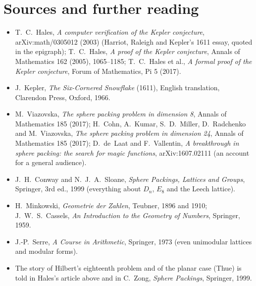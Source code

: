 \section*{Sources and further reading}

\begin{itemize}
\item T.~C.~Hales, \emph{A computer verification of the Kepler conjecture}, arXiv:math/0305012 (2003) (Harriot, Raleigh and Kepler's 1611 essay, quoted in the
epigraph); T.~C.~Hales, \emph{A proof of the Kepler conjecture}, Annals of Mathematics 162 (2005), 1065--1185; T.~C.~Hales et al., \emph{A formal proof of the
Kepler conjecture}, Forum of Mathematics, Pi 5 (2017).
\item J.~Kepler, \emph{The Six-Cornered Snowflake} (1611), English translation, Clarendon Press, Oxford, 1966.
\item M.~Viazovska, \emph{The sphere packing problem in dimension 8}, Annals of Mathematics 185 (2017); H.~Cohn, A.~Kumar, S.~D.~Miller, D.~Radchenko and
M.~Viazovska, \emph{The sphere packing problem in dimension 24}, Annals of Mathematics 185 (2017); D.~de~Laat and F.~Vallentin, \emph{A breakthrough in sphere
packing: the search for magic functions}, arXiv:1607.02111 (an account for a general audience).
\item J.~H.~Conway and N.~J.~A.~Sloane, \emph{Sphere Packings, Lattices and Groups}, Springer, 3rd ed., 1999 (everything about $D_n$, $E_8$ and the Leech lattice).
\item H.~Minkowski, \emph{Geometrie der Zahlen}, Teubner, 1896 and 1910; J.~W.~S.~Cassels, \emph{An Introduction to the Geometry of Numbers}, Springer, 1959.
\item J.-P.~Serre, \emph{A Course in Arithmetic}, Springer, 1973 (even unimodular lattices and modular forms).
\item The story of Hilbert's eighteenth problem and of the planar case (Thue) is told in Hales's article above and in C.~Zong, \emph{Sphere Packings},
Springer, 1999.
\end{itemize}
